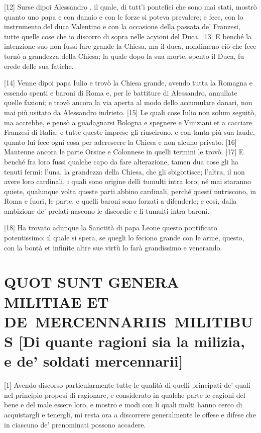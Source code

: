 {[}12{]} Surse dipoi Alessandro , il quale, di tutt'i pontefici che
sono mai stati, mostrò quanto uno papa e con danaio e con le forze si
poteva prevalere; e fece, con lo instrumento del duca Valentino e con la
occasione della passata de' Franzesi, tutte quelle cose che io discorro
di sopra nelle acyioni del Duca. {[}13{]} E benché la intenzione suo non
fussi fare grande la Chiesa, ma il duca, nondimeno ciò che fece tornò a
grandezza della Chiesa; la quale dopo la sua morte, spento il Duca, fu
erede delle sua fatiche.

{[}14{]} Venne dipoi papa Iulio e trovò la Chiesa grande, avendo tutta
la Romagna e essendo spenti e baroni di Roma e, per le battiture di
Alessandro, annullate quelle fazioni; e trovò ancora la via aperta al
modo dello accumulare danari, non mai più usitato da Alessandro
indrieto. {[}15{]} Le quali cose Iulio non solum seguitò, ma accrebbe, e
pensò a guadagnarsi Bologna e spegnere e Viniziani et a cacciare
Franzesi di Italia: e tutte queste imprese gli riuscirono, e con tanta
più sua laude, quanto lui fece ogni cosa per adcrescere la Chiesa e non
alcuno privato. {[}16{]} Mantenne ancora le parte Orsine e Colonnese in
quelli termini le trovò. {[}17{]} E benché fra loro fussi qualche capo
da fare alterazione, tamen dua cose gli ha tenuti fermi: l'una, la
grandezza della Chiesa, che gli sbigottisce; l'altra, il non avere loro
cardinali, i quali sono origine delli tumulti intra loro; né mai
staranno quiete, qualunque volta queste parti abbino cardinali, perché
questi nutriscono, in Roma e fuori, le parte, e quelli baroni sono
forzati a difenderle; e così, dalla ambizione de' prelati nascono le
discordie e li tumulti intra baroni.

\quebra

{[}18{]} Ha trovato adunque la
Sanctità di papa Leone questo pontificato potentissimo: il quale si
spera, se quegli lo feciono grande con le arme, questo, con la bontà et
infinite altre sue virtù lo farà grandissimo e venerando.

\quebra\section{QUOT SUNT GENERA MILITIAE ET DE~MERCENNARIIS~MILITIBUS\break
{[}Di quante ragioni sia la milizia, e de' soldati mercennarii{]}}

{[}1{]} Avendo discorso particularmente tutte le qualità di quelli
principati de' quali nel principio proposi di ragionare, e considerato
in qualche parte le cagioni del bene e del male essere loro, e mostro e
modi con li quali molti hanno cerco di acquistargli e tenergli, mi resta
ora a discorrere generalmente le offese e difese che in ciascuno de'
prenominati possono accadere.

